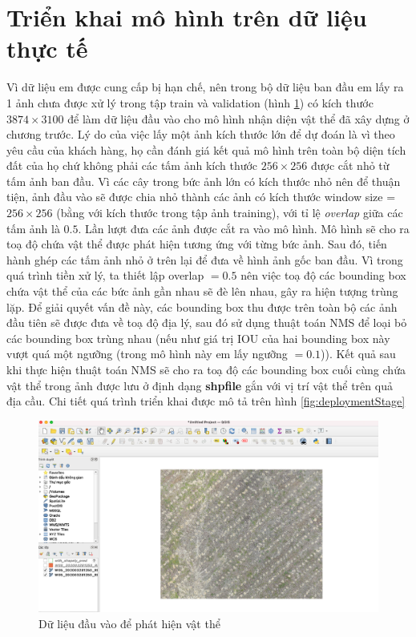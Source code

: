 \documentclass[a4paper, 12pt]{report}
\begin{document}
\section{Triển khai mô hình trên dữ liệu thực tế}
Vì dữ liệu em được cung cấp bị hạn chế, nên trong bộ dữ liệu ban đầu em lấy ra 1 ảnh chưa được xử lý trong tập train và validation (hình \ref{fig:demo}) có kích thước $3874 \times 3100$ để làm dữ liệu đầu vào cho mô hình nhận diện vật thể đã xây dựng ở chương trước.  Lý do của việc lấy một ảnh kích thước lớn để dự đoán là vì theo yêu cầu của khách hàng,  họ cần đánh giá kết quả mô hình trên toàn bộ diện tích đất của họ chứ không phải các tấm ảnh kích thước $256 \times 256$ được cắt nhỏ từ tấm ảnh ban đầu. Vì các cây trong bức ảnh lớn có kích thước nhỏ nên để thuận tiện, ảnh đầu vào sẽ được chia nhỏ thành các ảnh có kích thước window size = $256 \times 256$ (bằng với kích thước trong tập ảnh training),  với tỉ lệ \textit{overlap} giữa các tấm ảnh là $0.5$. Lần lượt đưa các ảnh được cắt ra vào mô hình.  Mô hình sẽ cho ra toạ độ chứa vật thể được phát hiện tương ứng với từng bức ảnh. Sau đó, tiến hành ghép các tấm ảnh nhỏ ở trên lại để đưa về hình ảnh gốc ban đầu.  Vì trong quá trình tiền xử lý, ta thiết lập overlap $= 0.5$ nên việc toạ độ các bounding box chứa vật thể của các bức ảnh gần nhau sẽ đè lên nhau,  gây ra hiện tượng trùng lặp.  Để giải quyết vấn đề này,  các bounding box thu được trên toàn bộ các ảnh đầu tiên sẽ được đưa về toạ độ địa lý, sau đó sử dụng thuật toán NMS để loại bỏ các bounding box trùng nhau (nếu như giá trị IOU của hai bounding box này vượt quá một ngưỡng (trong mô hình này em lấy ngưỡng $=0.1$)).  Kết quả sau khi thực hiện thuật toán NMS sẽ 
cho ra toạ độ các bounding box cuối cùng chứa vật thể trong ảnh được lưu ở định dạng \textbf{shpfile} gắn với vị trí vật thể trên quả địa cầu.  Chi tiết quá trình triển khai được mô tả trên hình \ref{fig:deploymentStage}
 \begin{figure}[!htb]
	\centering
	\includegraphics[width=1\linewidth]{Images/demo}
	\caption{Dữ liệu đầu vào để phát hiện vật thể}
	\label{fig:demo}
\end{figure}
\end{document}
